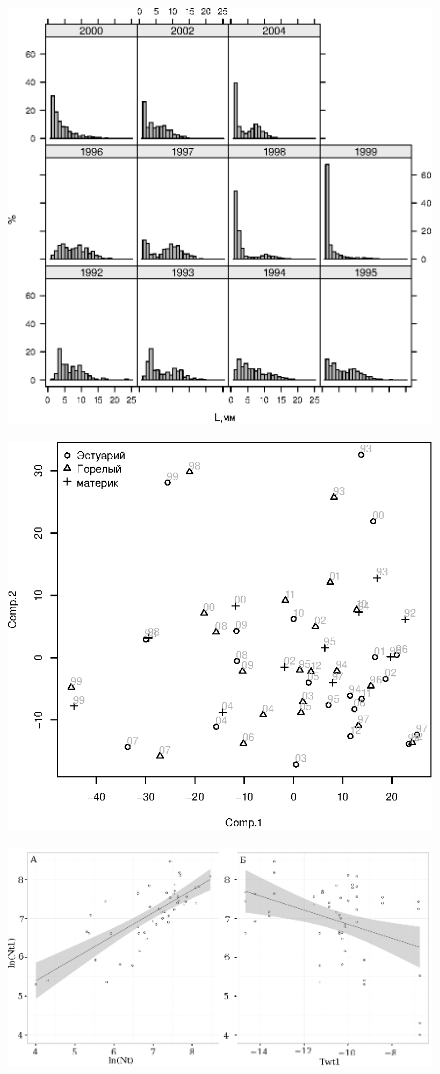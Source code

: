 \documentclass[12pt, a4paper]{article}
\begin{document}
	\begin{figure}[ht]
		\includegraphics[height=0.45\textheight]{Nazarova_fig5.eps}	
	\end{figure}

	\begin{figure}[ht]
		\includegraphics[height=0.45\textheight]{Nazarova_fig6.eps}	
	\end{figure}

	\begin{figure}[ht]
		\includegraphics[width=\textwidth]{Nazarova_fig7.eps}	
	\end{figure}
\end{document}
